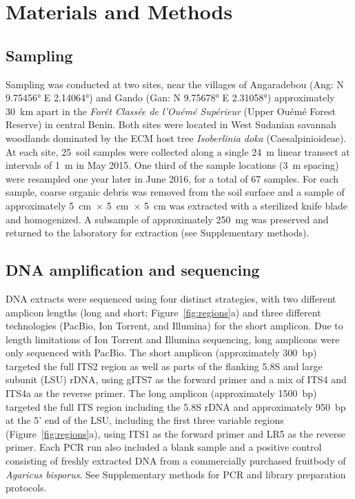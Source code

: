 \documentclass[
  12pt,
]{article}
\begin{document}
\hypertarget{materials-and-methods}{%
\section{Materials and Methods}\label{materials-and-methods}}

\hypertarget{sampling}{%
\subsection{Sampling}\label{sampling}}

Sampling was conducted at two sites, near the villages of Angaradebou (Ang: N 9.75456° E 2.14064°) and Gando (Gan: N 9.75678° E 2.31058°) approximately 30~km apart in the \emph{Forêt Classée de l'Ouémé Supérieur} (Upper Ouémé Forest Reserve) in central Benin.
Both sites were located in West Sudanian savannah woodlands \autocite{olson2001,yorou2014} dominated by the ECM host tree \emph{Isoberlinia doka} (Caesalpinioideae).
At each site, 25~soil samples were collected along a single 24~m linear transect at intervals of 1~m in May 2015.
One third of the sample locations (3~m spacing) were resampled one year later in June 2016, for a total of 67 samples.
For each sample, coarse organic debris was removed from the soil surface and a sample of approximately 5~cm~× 5~cm~× 5~cm was extracted with a sterilized knife blade and homogenized.
A subsample of approximately 250~mg was preserved and returned to the laboratory for extraction (see Supplementary methods).

\hypertarget{dna-amplification-and-sequencing}{%
\subsection{DNA amplification and sequencing}\label{dna-amplification-and-sequencing}}

DNA extracts were sequenced using four distinct strategies, with two different amplicon lengths (long and short; Figure~\ref{fig:regions}a) and three different technologies (PacBio, Ion Torrent, and Illumina) for the short amplicon.
Due to length limitations of Ion Torrent and Illumina sequencing, long amplicons were only sequenced with PacBio.
The short amplicon (approximately 300~bp) targeted the full ITS2 region as well as parts of the flanking 5.8S and large subunit (LSU) rDNA, using gITS7 \autocite{ihrmark2012} as the forward primer and a mix of ITS4 \autocite{white1990amplification} and ITS4a \autocite{urbina2016} as the reverse primer.
The long amplicon (approximately 1500~bp) targeted the full ITS region including the 5.8S rDNA and approximately 950~bp at the 5' end of the LSU, including the first three variable regions (Figure~\ref{fig:regions}a), using ITS1 \autocite{white1990amplification} as the forward primer and LR5 \autocite{vilgalys1990} as the reverse primer.
Each PCR run also included a blank sample and a positive control consisting of freshly extracted DNA from a commercially purchased fruitbody of \emph{Agaricus bisporus}.
See Supplementary methods for PCR and library preparation protocols.
\end{document}
